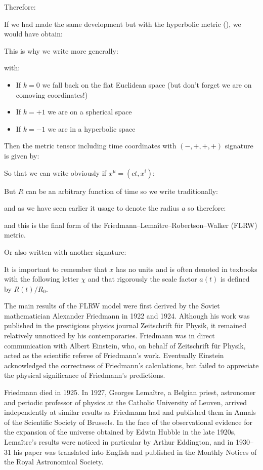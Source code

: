 	Therefore:
	
	If we had made the same development but with the hyperbolic metric (), we would have obtain:
	
	This is why we write more generally:
	
	with:
	\begin{itemize}
		\item If $k=0$ we fall back on the flat Euclidean space (but don't forget we are on comoving coordinates!)
		
		\item If $k=+1$ we are on a spherical space
		
		\item If $k=-1$ we are in a hyperbolic space
	\end{itemize}
	Then the metric tensor including time coordinates with $(-,+,+,+)$ signature is given by:
	
	So that we can write obviously if $x^\mu=(ct,x^i)$:
	
	But $R$ can be an arbitrary function of time so we write traditionally:
	
	and as we have seen earlier it usage to denote the radius $a$ so therefore:
	
	and this is the final form of the Friedmann–Lemaître–Robertson–Walker (FLRW) metric.
	
	Or also written with another signature:
	
	
	It is important to remember that $x$ has no units and is often denoted in texbooks with the following letter $\chi$ and that rigorously the scale factor $a(t)$ is defined by $R(t)/R_0$.

	The main results of the FLRW model were first derived by the Soviet mathematician Alexander Friedmann in 1922 and 1924. Although his work was published in the prestigious physics journal Zeitschrift für Physik, it remained relatively unnoticed by his contemporaries. Friedmann was in direct communication with Albert Einstein, who, on behalf of Zeitschrift für Physik, acted as the scientific referee of Friedmann's work. Eventually Einstein acknowledged the correctness of Friedmann's calculations, but failed to appreciate the physical significance of Friedmann's predictions.
	
	Friedmann died in 1925. In 1927, Georges Lemaître, a Belgian priest,	astronomer and periodic professor of physics at the Catholic University of Leuven, arrived independently at similar results as Friedmann had and published them in Annals of the Scientific Society of Brussels. In the face of the observational evidence for the expansion of the universe obtained by Edwin Hubble in the late 1920s, Lemaître's results were noticed in particular by Arthur Eddington, and in 1930–31 his paper was translated into English and published in the Monthly Notices of the Royal Astronomical Society.

